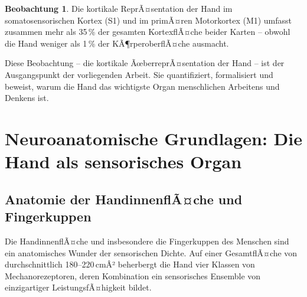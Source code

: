 ﻿\documentclass[12pt,a4paper]{report}
\theoremstyle{plain}
\theoremstyle{definition}
\newtheorem{beobachtung}[theorem]{Beobachtung}
\theoremstyle{remark}
\begin{document}
\begin{beobachtung}
Die kortikale ReprÃ¤sentation der Hand im somatosensorischen Kortex (S1)
und im primÃ¤ren Motorkortex (M1) umfasst zusammen mehr als 35\,\% der
gesamten KortexflÃ¤che beider Karten -- obwohl die Hand weniger als 1\,\%
der KÃ¶rperoberflÃ¤che ausmacht.
\end{beobachtung}

Diese Beobachtung -- die kortikale ÃœberreprÃ¤sentation der Hand -- ist der
Ausgangspunkt der vorliegenden Arbeit. Sie quantifiziert, formalisiert und
beweist, warum die Hand das wichtigste Organ menschlichen Arbeitens und
Denkens ist.

\chapter{Neuroanatomische Grundlagen: Die Hand als sensorisches Organ}
\label{chap:neuroanatomie}

\section{Anatomie der HandinnenflÃ¤che und Fingerkuppen}

Die HandinnenflÃ¤che und insbesondere die Fingerkuppen des Menschen sind
ein anatomisches Wunder der sensorischen Dichte. Auf einer GesamtflÃ¤che
von durchschnittlich 180--220\,cmÂ² beherbergt die Hand vier Klassen von
Mechanorezeptoren, deren Kombination ein sensorisches Ensemble von
einzigartiger LeistungsfÃ¤higkeit bildet.
\end{document}
